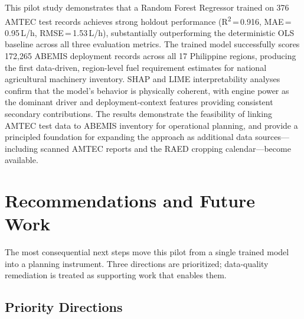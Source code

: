 \documentclass[conference]{IEEEtran}
\begin{document}
This pilot study demonstrates that a Random Forest Regressor trained on 376 AMTEC test records achieves strong holdout performance (R\textsuperscript{2}\,=\,0.916, MAE\,=\,0.95\,L/h, RMSE\,=\,1.53\,L/h), substantially outperforming the deterministic OLS baseline across all three evaluation metrics. The trained model successfully scores 172,265 ABEMIS deployment records across all 17 Philippine regions, producing the first data-driven, region-level fuel requirement estimates for national agricultural machinery inventory. SHAP and LIME interpretability analyses confirm that the model's behavior is physically coherent, with engine power as the dominant driver and deployment-context features providing consistent secondary contributions. The results demonstrate the feasibility of linking AMTEC test data to ABEMIS inventory for operational planning, and provide a principled foundation for expanding the approach as additional data sources---including scanned AMTEC reports and the RAED cropping calendar---become available.

\section{Recommendations and Future Work}

The most consequential next steps move this pilot from a single trained model into a planning instrument. Three directions are prioritized; data-quality remediation is treated as supporting work that enables them.

\subsection{Priority Directions}
\end{document}
